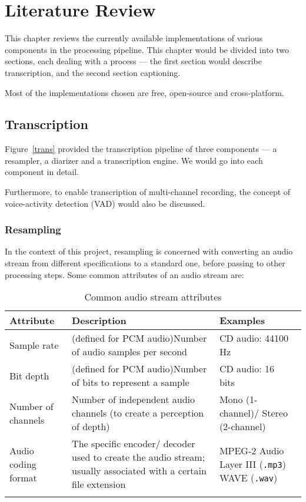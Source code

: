 \chapter{Literature Review}

This chapter reviews the currently available implementations of various
components in the processing pipeline. This chapter would be divided into
two sections, each dealing with a process --- the first section would
describe transcription, and the second section captioning.

Most of the implementations chosen are free, open-source and cross-platform.

\section{Transcription}

Figure~\ref{trans} provided the transcription pipeline of three components
--- a resampler, a diarizer and a transcription engine. We would go into
each component in detail.

Furthermore, to enable transcription of multi-channel recording, the concept
of voice-activity detection (VAD) would also be discussed.

\subsection{Resampling}

In the context of this project, resampling is concerned with converting an
audio stream from different specifications to a standard one, before passing to
other processing steps. Some common attributes of an audio stream are:

\begin{longtabu}{X[1.5,l]X[4,l]X[2.5,l]}
    \textbf{Attribute} & \textbf{Description} & \textbf{Examples} \\
    \midrule
    \endhead{}
    Sample rate &
    (defined for PCM audio)\newline Number of audio samples per
    second~\cite{weik1995communications} &
    CD audio: 44100 Hz~\cite{sample-rate} \\
    Bit depth &
    (defined for PCM audio)\newline Number of bits to represent
    a sample~\cite{thompson2005understanding} &
    CD audio: 16 bits~\cite{iec60908} \\
    Number of channels &
    Number of independent audio channels (to create a
    perception of depth) &
    Mono (1-channel)/\newline
    Stereo (2-channel)~\cite{mono-stereo} \\
    Audio coding format &
    The specific encoder/ decoder used to create the audio stream;
    usually associated with a certain file extension &
    MPEG-2 Audio Layer III (\texttt{.mp3})~\cite{mp3}\newline
    WAVE (\texttt{.wav})~\cite{wav} \\
    \caption{Common audio stream attributes}
\end{longtabu}

